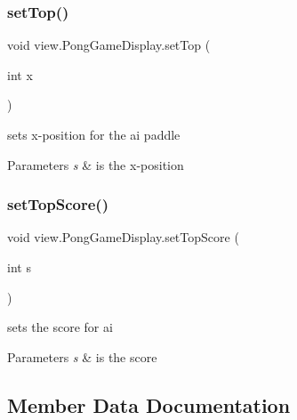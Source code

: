 \subsubsection{\texorpdfstring{set\+Top()}{setTop()}}
{\footnotesize\ttfamily void view.\+Pong\+Game\+Display.\+set\+Top (\begin{DoxyParamCaption}\item[{int}]{x }\end{DoxyParamCaption})}



sets x-\/position for the ai paddle 


\begin{DoxyParams}{Parameters}
{\em s} & is the x-\/position \\
\hline
\end{DoxyParams}
\hypertarget{classview_1_1_pong_game_display_a04bcc8b60d85f38178d2cd817e3fbd39}{}\label{classview_1_1_pong_game_display_a04bcc8b60d85f38178d2cd817e3fbd39} 
\subsubsection{\texorpdfstring{set\+Top\+Score()}{setTopScore()}}
{\footnotesize\ttfamily void view.\+Pong\+Game\+Display.\+set\+Top\+Score (\begin{DoxyParamCaption}\item[{int}]{s }\end{DoxyParamCaption})}



sets the score for ai 


\begin{DoxyParams}{Parameters}
{\em s} & is the score \\
\hline
\end{DoxyParams}


\subsection{Member Data Documentation}
\hypertarget{classview_1_1_pong_game_display_a3aa7541f41ee227f6f7c3acf0bd35871}{}\label{classview_1_1_pong_game_display_a3aa7541f41ee227f6f7c3acf0bd35871} 
